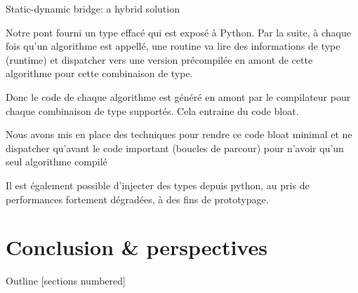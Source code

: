 \documentclass[12pt,aspectratio=169]{beamer}
\begin{document}
\begin{frame}{Static-dynamic bridge: a hybrid solution}
{    Notre pont fourni un type effacé qui est exposé à Python. Par la suite, à chaque fois qu'un algorithme est appellé, une routine va lire des informations de type (runtime) et dispatcher vers une version précompilée en amont de cette algorithme pour cette combinaison de type.

    Donc le code de chaque algorithme est généré en amont par le compilateur pour chaque combinaison de type supportés. Cela entraine du code bloat.

    Nous avons mis en place des techniques pour rendre ce code bloat minimal et ne dispatcher qu'avant le code important (boucles de parcour) pour n'avoir qu'un seul algorithme compilé

    Il est également possible d'injecter des types depuis python, au pris de performances fortement dégradées, à des fins de prototypage.
  }
\end{frame}

%
%
%

\section[Conclusion \& perspectives]{Conclusion \& perspectives}

\begin{frame}{Outline}
  [sections numbered]
  \vspace{0.2cm}
  \small%
  \tableofcontents[currentsection]
  \pdfcomment[icon=Note]{   }
\end{frame}
\end{document}
